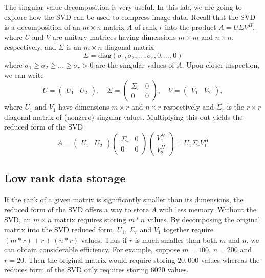 

The singular value decomposition is very useful.  In this lab, we are going to explore how the SVD can be used to compress image data.  Recall that the SVD is a decomposition of an $m \times n$ matrix $A$
of rank $r$ into the product $A = U \Sigma V^H$, where $U$ and $V$
are unitary matrices having dimensions $m \times m$ and $n \times n$,
respectively, and $\Sigma$ is an $m \times n$ diagonal matrix
\begin{equation*}
\Sigma = \mbox{diag}(\sigma_1,\sigma_2,\ldots,\sigma_r,0,\ldots,0)
\end{equation*}
where $\sigma_1 \geq \sigma_2 \geq \ldots \geq \sigma_r > 0$ are the
singular values of $A$.  Upon closer inspection, we can write
\begin{equation*}
U = \begin{pmatrix}U_1 & U_2\end{pmatrix}, \quad \Sigma =
\begin{pmatrix}\Sigma_r & 0\\0 & 0\end{pmatrix}, \quad V =
\begin{pmatrix}V_1 & V_2\end{pmatrix},
\end{equation*}
where $U_1$ and $V_1$ have dimensions $m\times r$ and $n\times r$
respectively and $\Sigma_r$ is the $r\times r$ diagonal matrix of
(nonzero) singular values.  Multiplying this out yields the reduced
form of the SVD
\begin{equation*}
A =
\begin{pmatrix}U_1 & U_2\end{pmatrix}
\begin{pmatrix}\Sigma_r & 0\\0 & 0\end{pmatrix}
\begin{pmatrix}V^H_1 \\ V^H_2\end{pmatrix} =
U_1 \Sigma_r V_1^H
\end{equation*}

\subsection*{Low rank data storage}
If the rank of a given matrix is significantly smaller than its
dimensions, the reduced form of the SVD offers a way to store $A$ with less memory.
Without the SVD, an $m\times n$ matrix requires storing $m*n$ values.
By decomposing the original matrix into the SVD reduced form, $U_1$, $\Sigma_r$ and $V_1$ together require $(m*r)+r+(n*r)$ values.
  Thus if $r$ is much smaller than both $m$ and $n$,
we can obtain considerable efficiency.  For example, suppose
$m=100$, $n=200$ and $r=20$. 
Then the original matrix would require storing $20,000$ values whereas the reduces form of the SVD only requires storing $6020$ values.

